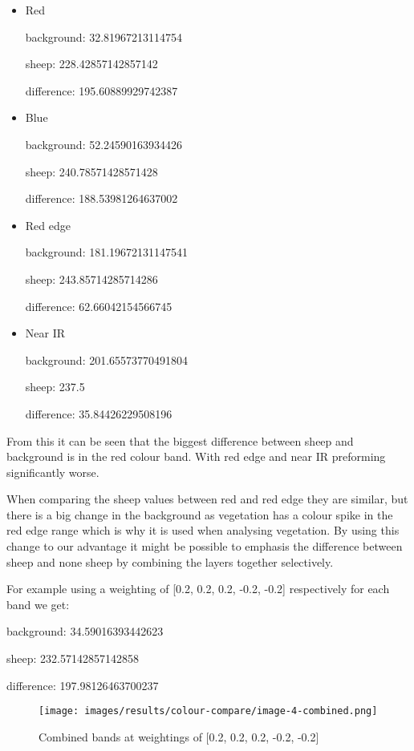 \begin{itemize}
    \item Red
    
background: 32.81967213114754

sheep: 228.42857142857142

difference: 195.60889929742387

\item Blue

background: 52.24590163934426

sheep: 240.78571428571428

difference: 188.53981264637002

\item Red edge

background: 181.19672131147541

sheep: 243.85714285714286

difference: 62.66042154566745

\item Near IR

background: 201.65573770491804

sheep: 237.5

difference: 35.84426229508196

\end{itemize}

From this it can be seen that the biggest difference between sheep and background is in the red colour band. With red edge and near IR preforming significantly worse.

When comparing the sheep values between red and red edge they are similar, but there is a big change in the background as vegetation has a colour spike in the red edge range which is why it is used when analysing vegetation. By using this change to our advantage it might be possible to emphasis the difference between sheep and none sheep by combining the layers together selectively.

For example using a weighting of [0.2, 0.2, 0.2, -0.2, -0.2] respectively for each band we get:

background: 34.59016393442623

sheep: 232.57142857142858

difference: 197.98126463700237

\begin{figure}[H]
    \centering
    \texttt{[image: images/results/colour-compare/image-4-combined.png]}
    \caption{Combined bands at weightings of [0.2, 0.2, 0.2, -0.2, -0.2]}
    \label{fig:colour-bands-combined}
\end{figure}

